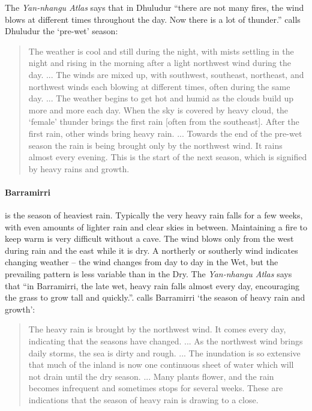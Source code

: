 The \textit{Yan-nhangu Atlas} says that in Dhuludur ``there are not many
fires, the wind blows at different times throughout the day. Now there is
a lot of thunder.''  \citet{davis1989} calls Dhuludur the `pre-wet' season:
\begin{quote}
    The weather is cool and still during the night, with mists settling in the night
    and rising in the morning after a light northwest wind during the day. ...
    The winds are mixed up, with southwest, southeast, northeast, and northwest winds
    each blowing at different times, often during the same day. ...
    The weather begins to get hot and humid as the clouds build up more and more each day.
    When the sky is covered by heavy cloud, the `female' thunder brings
    the first rain [often from the southeast].
    After the first rain, other winds bring heavy rain.
    ...
    Towards the end of the pre-wet season the rain is being brought only by the northwest wind.
    It rains almost every evening.
    This is the start of the next season, which is signified by heavy rains and growth.
\end{quote}


\paragraph{Barramirri} is the season of heaviest rain.  Typically the
very heavy rain falls for a few weeks, with even amounts of lighter rain
and clear skies in between.  Maintaining a fire to keep warm is very
difficult without a cave.  The wind blows only from the west during rain
and the east while it is dry.  A northerly or southerly wind indicates
changing weather -- the wind changes from day to day in the Wet, but the
prevailing pattern is less variable than in the Dry.
%
The \textit{Yan-nhangu Atlas} says that ``in Barramirri, the late wet,
heavy rain falls almost every day, encouraging the grass to grow tall
and quickly.''.
%
\citet{davis1989} calls Barramirri `the season of heavy rain and growth':
\begin{quote}
    The heavy rain is brought by the northwest wind. It comes every day,
    indicating that the seasons have changed. ... As the northwest wind
    brings daily storms, the sea is dirty and rough. ... The inundation
    is so extensive that much of the inland is now one continuous sheet
    of water which will not drain until the dry season. ...
    Many plants flower, and the rain becomes infrequent and sometimes
    stops for several weeks.  These are indications that the season of
    heavy rain is drawing to a close.
\end{quote}


